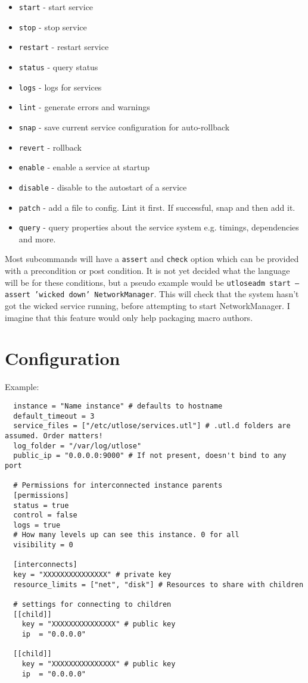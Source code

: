\documentclass{article}
\newcommand*{\bibtitle}{Bibliography}
\begin{document}
\begin{itemize}
  \item \texttt{start} - start service
  \item \texttt{stop} - stop service
  \item \texttt{restart} - restart service
  \item \texttt{status} - query status
  \item \texttt{logs} - logs for services
  \item \texttt{lint} - generate errors and warnings
  \item \texttt{snap} - save current service configuration for auto-rollback
  \item \texttt{revert} - rollback
  \item \texttt{enable} - enable a service at startup
  \item \texttt{disable} - disable to the autostart of a service
  \item \texttt{patch} - add a file to config. Lint it first. If successful, snap and then add it.
  \item \texttt{query} - query properties about the service system e.g. timings, dependencies and more.
\end{itemize}

Most subcommands will have a \texttt{assert} and \texttt{check} option which can be provided with a
precondition or post condition. It is not yet decided what the language will be for these conditions,
but a pseudo example would be \texttt{utloseadm start --assert 'wicked down' NetworkManager}. This
will check that the system hasn't got the wicked service running, before attempting to start NetworkManager.
I imagine that this feature would only help packaging macro authors.

\section{Configuration}
Example:
\begin{verbatim}
  instance = "Name instance" # defaults to hostname
  default_timeout = 3
  service_files = ["/etc/utlose/services.utl"] # .utl.d folders are assumed. Order matters!
  log_folder = "/var/log/utlose"
  public_ip = "0.0.0.0:9000" # If not present, doesn't bind to any port
  
  # Permissions for interconnected instance parents
  [permissions]
  status = true
  control = false
  logs = true
  # How many levels up can see this instance. 0 for all
  visibility = 0 

  [interconnects]
  key = "XXXXXXXXXXXXXXX" # private key
  resource_limits = ["net", "disk"] # Resources to share with children

  # settings for connecting to children
  [[child]]
    key = "XXXXXXXXXXXXXXX" # public key
    ip  = "0.0.0.0"

  [[child]]
    key = "XXXXXXXXXXXXXXX" # public key
    ip  = "0.0.0.0"
\end{verbatim}



\setlength{\baselineskip}{0pt} %

{\renewcommand*\MakeUppercase[1]{#1}%
\printbibliography[heading=bibintoc,title={\bibtitle}]}
\end{document}
